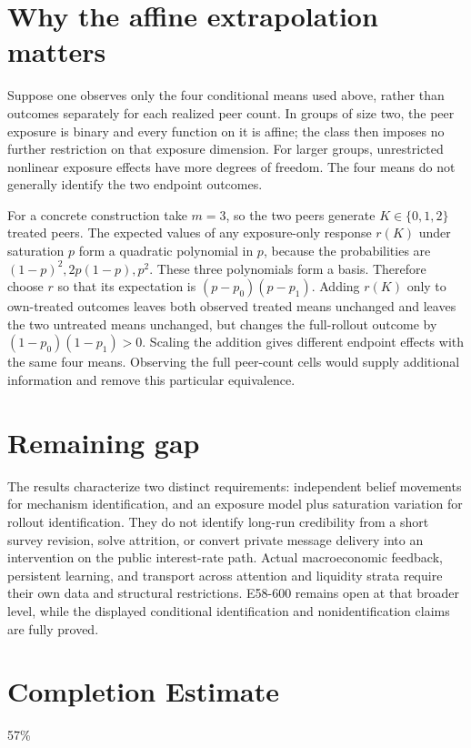 \documentclass[11pt]{article}
\theoremstyle{definition}
\begin{document}
\section*{Why the affine extrapolation matters}
Suppose one observes only the four conditional means used above, rather than outcomes separately for each realized peer count. In groups of size two, the peer exposure is binary and every function on it is affine; the class then imposes no further restriction on that exposure dimension. For larger groups, unrestricted nonlinear exposure effects have more degrees of freedom. The four means do not generally identify the two endpoint outcomes.

For a concrete construction take $m=3$, so the two peers generate $K\in\{0,1,2\}$ treated peers. The expected values of any exposure-only response $r(K)$ under saturation $p$ form a quadratic polynomial in $p$, because the probabilities are $(1-p)^2,2p(1-p),p^2$. These three polynomials form a basis. Therefore choose $r$ so that its expectation is $(p-p_0)(p-p_1)$. Adding $r(K)$ only to own-treated outcomes leaves both observed treated means unchanged and leaves the two untreated means unchanged, but changes the full-rollout outcome by $(1-p_0)(1-p_1)>0$. Scaling the addition gives different endpoint effects with the same four means. Observing the full peer-count cells would supply additional information and remove this particular equivalence.

\section*{Remaining gap}
The results characterize two distinct requirements: independent belief movements for mechanism identification, and an exposure model plus saturation variation for rollout identification. They do not identify long-run credibility from a short survey revision, solve attrition, or convert private message delivery into an intervention on the public interest-rate path. Actual macroeconomic feedback, persistent learning, and transport across attention and liquidity strata require their own data and structural restrictions. E58-600 remains open at that broader level, while the displayed conditional identification and nonidentification claims are fully proved.

\section{Completion Estimate}
57\%
\end{document}
